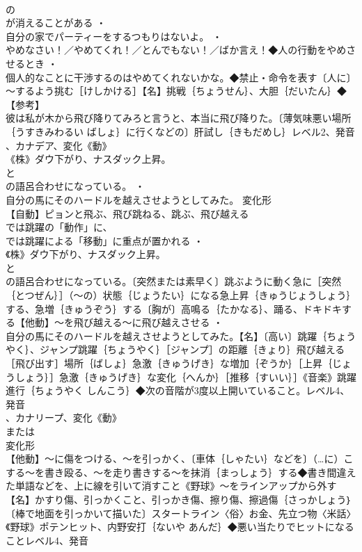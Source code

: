 \documentclass[8pt]{extreport}
\begin{document}
\begin{CJK}{UTF8}{min}
\\	の
\\	が消えることがある ・
\\	自分の家でパーティーをするつもりはないよ。 ・
\\	やめなさい！／やめてくれ！／とんでもない！／ばか言え！◆人の行動をやめさせるとき ・
\\	個人的なことに干渉するのはやめてくれないかな。◆禁止・命令を表す〔人に〕～するよう挑む［けしかける］【名】挑戦｛ちょうせん｝、大胆｛だいたん｝◆【参考】
\\	彼は私が木から飛び降りてみろと言うと、本当に飛び降りた。〔薄気味悪い場所｛うすきみわるい ばしょ｝に行くなどの〕肝試し｛きもだめし｝レベル2、発音
\\	、カナデア、変化《動》
\\	《株》ダウ下がり、ナスダック上昇。
\\	と
\\	の語呂合わせになっている。 ・
\\	自分の馬にそのハードルを越えさせようとしてみた。	変化形 
\\	【自動】ピョンと飛ぶ、飛び跳ねる、跳ぶ、飛び越える
\\	では跳躍の「動作」に、
\\	では跳躍による「移動」に重点が置かれる ・
\\	《株》ダウ下がり、ナスダック上昇。
\\	と
\\	の語呂合わせになっている。〔突然または素早く〕跳ぶように動く急に［突然｛とつぜん｝］（～の）状態｛じょうたい｝になる急上昇｛きゅうじょうしょう｝する、急増｛きゅうぞう｝する〔胸が〕高鳴る｛たかなる｝、踊る、ドキドキする【他動】～を飛び越える～に飛び越えさせる ・
\\	自分の馬にそのハードルを越えさせようとしてみた。【名】〔高い〕跳躍｛ちょうやく｝、ジャンプ跳躍｛ちょうやく｝［ジャンプ］の距離｛きょり｝飛び越える［飛び出す］場所｛ばしょ｝急激｛きゅうげき｝な増加｛ぞうか｝［上昇｛じょうしょう｝］急激｛きゅうげき｝な変化｛へんか｝［推移｛すいい｝］《音楽》跳躍進行｛ちょうやく しんこう｝◆次の音階が3度以上開いていること。レベル4、発音
\\	、カナリープ、変化《動》
\\	または
\\	変化形 
\\	【他動】～に傷をつける、～を引っかく、〔車体｛しゃたい｝などを〕（…に）こする～を書き殴る、～を走り書きする～を抹消｛まっしょう｝する◆書き間違えた単語などを、上に線を引いて消すこと《野球》～をラインアップから外す【名】かすり傷、引っかくこと、引っかき傷、擦り傷、擦過傷｛さっかしょう｝〔棒で地面を引っかいて描いた〕スタートライン〈俗〉お金、先立つ物〈米話〉《野球》ポテンヒット、内野安打｛ないや あんだ｝◆悪い当たりでヒットになることレベル4、発音

\end{CJK}
\end{document}
